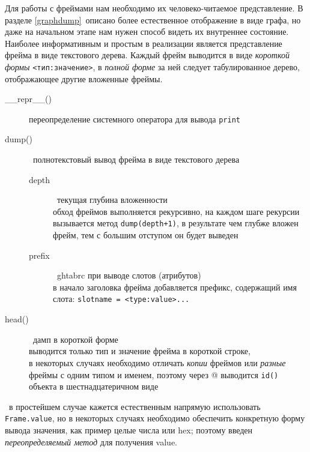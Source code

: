 
Для работы с фреймами нам необходимо их человеко-читаемое представление. В
разделе \ref{graphdump}\ описано более естественное отображение в виде графа, но
даже на начальном этапе нам нужен способ видеть их внутреннее состояние.
Наиболее информативным и простым в реализации является представление фрейма в
виде текстового дерева. Каждый фрейм выводится в виде \emph{короткой формы}
\verb|<тип:значение>|, в \emph{полной форме} за ней следует табулированное
дерево, отображающее другие вложенные фреймы.

\smallskip
{}

\begin{description}
\item[\_\_repr\_\_()] переопределение системного оператора для вывода
\verb|print|
\item[dump()]\ полнотекстовый вывод фрейма в виде текстового дерева
\begin{description}
\item[depth]\ текущая глубина вложенности\\
обход фреймов выполняется рекурсивно, на каждом шаге рекурсии вызывается метод
\verb|dump(depth+1)|, в результате чем глубже вложен фрейм, тем с большим
отступом он будет выведен
\item[prefix]\ ghtabrc при выводе слотов (атрибутов)\\
в начало заголовка фрейма добавляется префикс, содержащий имя слота:
\verb|slotname = <type:value>...|
\end{description}
\end{description}

\smallskip
{}
 \begin{description}
\item[head()]\ дамп в короткой форме\\
выводится только тип и значение фрейма в короткой строке,\\
в некоторых случаях необходимо отличать \textit{копии} фреймов или
\textit{разные} фреймы с одним типом и именем, поэтому через @ выводится
\verb|id()| объекта в шестнадцатеричном виде
\end{description}


\begin{description} \label{dumpstr}
\item[str()]\ в простейшем случае кажется естественным напрямую
использовать \verb|Frame.value|, но в некоторых случаях необходимо обеспечить
конкретную форму вывода значения, как пример целые числа или hex; поэтому
введен \emph{переопределяемый метод} для получения value.
\end{description}

